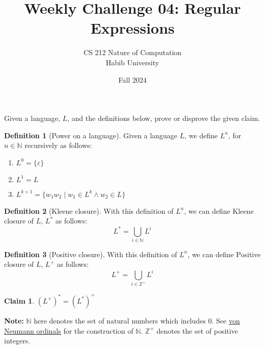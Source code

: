 \documentclass[a4paper]{exam}
\title{Weekly Challenge 04: Regular Expressions}
\author{CS 212 Nature of Computation\\Habib University}
\date{Fall 2024}
\theoremstyle{definition}
\newtheorem{definition}{Definition}
\theoremstyle{claim}
\newtheorem{claim}{Claim}
\begin{document}
\maketitle

\begin{questions}
    Given a language, $L$, and the definitions below, prove or disprove the given claim.

    \begin{definition}[Power on a language]
        Given a language $L$, we define $L^n$, for $n \in \mathbb{N}$ recursively as follows:
        \begin{enumerate}
            \item $L^0 = \{\varepsilon\}$ 
            \item $L^1 = L$
            \item $L^{k+1} = \{w_1w_2\mid w_1 \in L^k \land w_2 \in L\}$
        \end{enumerate}
    \end{definition}
    \begin{definition}[Kleene closure]
        With this definition of $L^n$, we can define Kleene closure of $L$, $L^*$ as follows:
        $$L^*=\bigcup_{i \in \mathbb{N}} L^i$$
    \end{definition}
    \begin{definition}[Positive closure]
        With this definition of $L^n$, we can define Positive closure of $L$, $L^+$ as follows:
        $$L^+=\bigcup_{i \in \mathbb{Z}^+} L^i$$
    \end{definition}
    \begin{claim}
      $(L^+)^*=(L^*)^+$
    \end{claim}  
    
    \textbf{Note:} $\mathbb{N}$ here denotes the set of natural numbers which includes 0. See \href{https://en.wikipedia.org/wiki/Set-theoretic_definition_of_natural_numbers}{von Neumann ordinals} for the construction of $\mathbb{N}$.
    $\mathbb{Z}^+$ denotes the set of positive integers.
  \begin{solution}
    
  \end{solution}
  
\end{questions}
\end{document}
